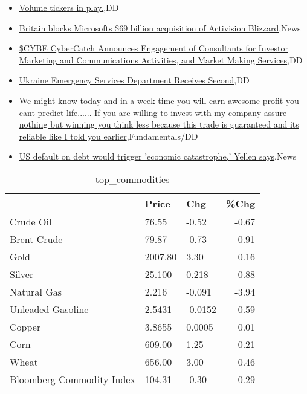 \documentclass{article}%
\begin{document}
%
\begin{itemize}%
\item%
\href{https://reddit.com/r/wallstreetbets/comments/12zfj8y/volume\_tickers\_in\_play/}{Volume tickers in play.},DD%
\item%
\href{https://reddit.com/r/wallstreetbets/comments/12zedri/britain\_blocks\_microsofts\_69\_billion\_acquisition/}{Britain blocks Microsofts \$69 billion acquisition of Activision Blizzard},News%
\item%
\href{https://reddit.com/r/Baystreetbets/comments/12yzcqh/cybe\_cybercatch\_announces\_engagement\_of/}{\$CYBE CyberCatch Announces Engagement of Consultants for Investor Marketing and Communications Activities, and Market Making Services},DD%
\item%
\href{https://reddit.com/r/Baystreetbets/comments/12ymz6z/ukraine\_emergency\_services\_department\_receives/}{Ukraine Emergency Services Department Receives Second},DD%
\item%
\href{https://reddit.com/r/StockMarket/comments/12zbszl/we\_might\_know\_today\_and\_in\_a\_week\_time\_you\_will/}{We might know today and in a week time you will earn awesome profit you cant predict life...... If you are willing to invest with my company assure nothing but winning you think less because this trade is  guaranteed and its reliable like I told you earlier},Fundamentals/DD%
\item%
\href{https://reddit.com/r/Economics/comments/12zbqpz/us\_default\_on\_debt\_would\_trigger\_economic/}{US default on debt would trigger 'economic catastrophe,' Yellen says},News%
\end{itemize}%


\begin{table}[htbp]%
\caption{top\_commodities}%
\centering%
\begin{adjustbox}{width=1\textwidth}%
\begin{tabular}{lllr}
\toprule
                          &   Price &     Chg &  \%Chg \\
\midrule
               Crude Oil  &   76.55 &   -0.52 & -0.67 \\
             Brent Crude  &   79.87 &   -0.73 & -0.91 \\
                    Gold  & 2007.80 &    3.30 &  0.16 \\
                  Silver  &  25.100 &   0.218 &  0.88 \\
             Natural Gas  &   2.216 &  -0.091 & -3.94 \\
       Unleaded Gasoline  &  2.5431 & -0.0152 & -0.59 \\
                  Copper  &  3.8655 &  0.0005 &  0.01 \\
                    Corn  &  609.00 &    1.25 &  0.21 \\
                   Wheat  &  656.00 &    3.00 &  0.46 \\
Bloomberg Commodity Index &  104.31 &   -0.30 & -0.29 \\
\bottomrule
\end{tabular}
%
\end{adjustbox}%
\end{table}
\end{document}
